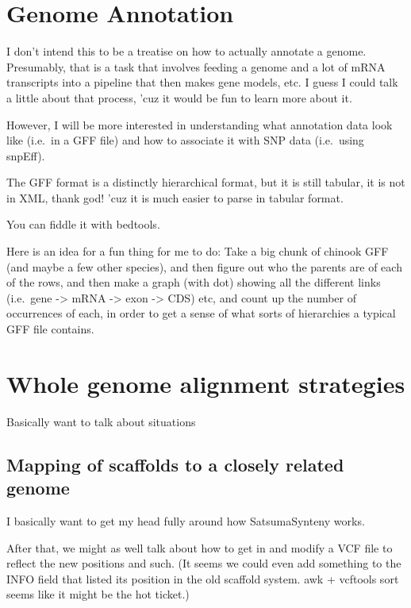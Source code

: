 \documentclass[]{krantz}
\begin{document}
\hypertarget{genome-annotation}{%
\chapter{Genome Annotation}\label{genome-annotation}}

I don't intend this to be a treatise on how to actually annotate a genome.
Presumably, that is a task that involves feeding a genome and a lot of mRNA
transcripts into a pipeline that then makes gene models, etc. I guess I could
talk a little about that process, 'cuz it would be fun to learn more about it.

However, I will be more interested in understanding what annotation data look like
(i.e.~in a GFF file) and how to associate it with SNP data (i.e.~using snpEff).

The GFF format is a distinctly hierarchical format, but it is still tabular,
it is not in XML, thank god! 'cuz it is much easier to parse in tabular format.

You can fiddle it with bedtools.

Here is an idea for a fun thing for me to do: Take a big chunk of chinook GFF
(and maybe a few other species), and then figure out who the parents are of each of the
rows, and then make a graph (with dot) showing all the different links (i.e.~gene -\textgreater{} mRNA -\textgreater{} exon -\textgreater{} CDS)
etc, and count up the number of occurrences of each, in order to get a sense of what
sorts of hierarchies a typical GFF file contains.

\hypertarget{whole-genome-alignment-strategies}{%
\chapter{Whole genome alignment strategies}\label{whole-genome-alignment-strategies}}

Basically want to talk about situations

\hypertarget{mapping-of-scaffolds-to-a-closely-related-genome}{%
\section{Mapping of scaffolds to a closely related genome}\label{mapping-of-scaffolds-to-a-closely-related-genome}}

I basically want to get my head fully around how SatsumaSynteny works.

After that, we might as well talk about how to get in and modify a VCF file to reflect the new positions and such. (It seems we could even add something to the INFO field that listed its position in the old scaffold system. awk + vcftools sort seems like it might be the hot ticket.)
\end{document}
